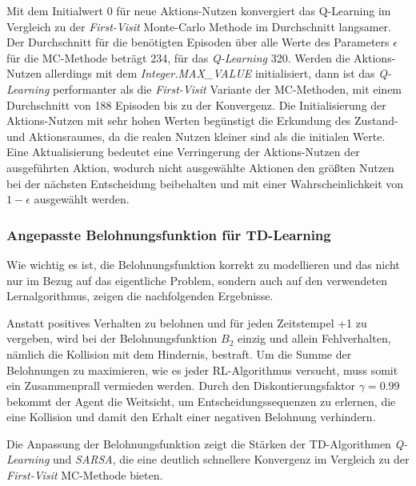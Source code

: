 Mit dem Initialwert 0 für neue Aktions-Nutzen konvergiert das Q-Learning im Vergleich zu der \textit{First-Visit} Monte-Carlo Methode im Durchschnitt langsamer. Der Durchschnitt für die benötigten Episoden über alle Werte des Parameters $\epsilon$ für die MC-Methode beträgt 234, für das \textit{Q-Learning} 320. Werden die Aktions-Nutzen allerdings mit dem \textit{Integer.MAX\_VALUE} initialisiert, dann ist das \textit{Q-Learning} performanter als die \textit{First-Visit} Variante der MC-Methoden, mit einem Durchschnitt von 188 Episoden bis zu der Konvergenz. Die Initialisierung der Aktions-Nutzen mit sehr hohen Werten begünstigt die Erkundung des Zustand- und Aktionsraumes, da die realen Nutzen kleiner sind als die initialen Werte. Eine Aktualisierung bedeutet eine Verringerung der Aktions-Nutzen der ausgeführten Aktion, wodurch nicht ausgewählte Aktionen den größten Nutzen bei der nächsten Entscheidung beibehalten und mit einer Wahrscheinlichkeit von $1-\epsilon$ ausgewählt werden.
\par 

\subsubsection*{Angepasste Belohnungsfunktion für TD-Learning}
Wie wichtig es ist, die Belohnungsfunktion korrekt zu modellieren und das nicht nur im Bezug auf das eigentliche Problem, sondern auch auf den verwendeten Lernalgorithmus, zeigen die nachfolgenden Ergebnisse.
\par 
Anstatt positives Verhalten zu belohnen und für jeden Zeitstempel +1 zu vergeben, wird bei der Belohnungsfunktion $B_2$ einzig und allein Fehlverhalten, nämlich die Kollision mit dem Hindernis, bestraft. Um die Summe der Belohnungen zu maximieren, wie es jeder RL-Algorithmus versucht, muss somit ein Zusammenprall vermieden werden. Durch den Diskontierungsfaktor $\gamma = 0.99$ bekommt der Agent die \glqq Weitsicht\grqq{}, um Entscheidungssequenzen zu erlernen, die eine Kollision und damit den Erhalt einer negativen Belohnung verhindern. 
\par 
Die Anpassung der Belohnungsfunktion zeigt die Stärken der TD-Algorithmen \textit{Q-Learning} und \textit{SARSA}, die eine deutlich schnellere Konvergenz im Vergleich zu der \textit{First-Visit} MC-Methode bieten.

